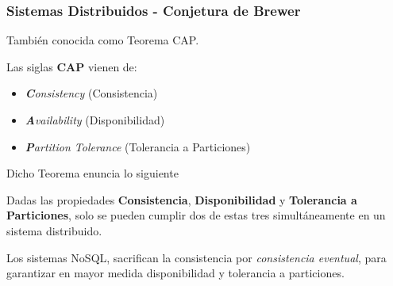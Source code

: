 \begin{frame}
    \frametitle{Sistemas Distribuidos - Conjetura de Brewer}

    También conocida como Teorema CAP.

     
    
    Las siglas \textbf{CAP} vienen de:

     

    \begin{itemize}
        \item \textit{\textbf{C}onsistency} (Consistencia)                        

        \item \textit{\textbf{A}vailability} (Disponibilidad)                     

        \item \textit{\textbf{P}artition Tolerance} (Tolerancia a Particiones)
        
    \end{itemize}

      
    
    Dicho Teorema enuncia lo siguiente

     
    
    \begin{Teorema}
    Dadas las propiedades \textbf{Consistencia}, \textbf{Disponibilidad} y \textbf{Tolerancia a Particiones}, solo se pueden cumplir dos de estas tres simultáneamente en un sistema distribuido.
    \end{Teorema}

     

    Los sistemas NoSQL, sacrifican la consistencia por \textit{consistencia eventual}, para garantizar en mayor medida disponibilidad y tolerancia a particiones.
    
\end{frame}